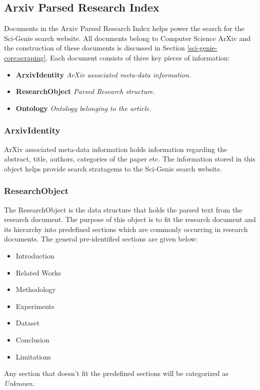\subsection{Arxiv Parsed Research Index}

Documents in the Arxiv Parsed Research Index helps power the search for the Sci-Genie search website. All documents belong to Computer Science ArXiv and 
the construction of these documents is discussed in Section \ref{sci-genie-core:scraping}. Each document consists of three 
key pieces of information:
\begin{itemize}
    \item \textbf{ArxivIdentity} \textit{ArXiv associated meta-data information.}
    \item \textbf{ResearchObject} \textit{Parsed Research structure.}
    \item \textbf{Ontology} \textit{Ontology belonging to the article.}
\end{itemize}

\subsubsection{ArxivIdentity}
ArXiv associated meta-data information holds information regarding the abstract, title, authors, categories of the paper etc. 
The information stored in this object helps provide search stratagems to the Sci-Genie search website. 

\subsubsection{ResearchObject}
\label{sci-genie-core:data-layer:researchobj}
The ResearchObject is the data structure that holds the parsed text from the research document. 
The purpose of this object is to fit the research document and its hierarchy into predefined sections
which are commonly occurring in research documents. The general pre-identified sections are given below:
\begin{itemize}
    \item Introduction
    \item Related Works
    \item Methodology
    \item Experiments
    \item Dataset
    \item Conclusion
    \item Limitations
\end{itemize} 
Any section that doesn't fit the predefined sections will be categorized as \textit{Unknown}. 

